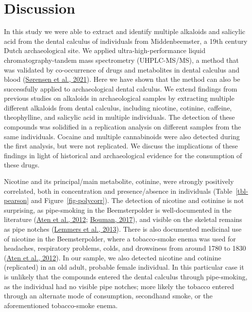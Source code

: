 \documentclass[
  letterpaper,
]{book}
\begin{document}
\hypertarget{discussion-2}{%
\section{Discussion}\label{discussion-2}}

In this study we were able to extract and identify multiple alkaloids
and salicylic acid from the dental calculus of individuals from
Middenbeemster, a 19th century Dutch archaeological site. We applied
ultra-high-performance liquid chromatography-tandem mass spectrometry
(UHPLC-MS/MS), a method that was validated by co-occurrence of drugs and
metabolites in dental calculus and blood
(\protect\hyperlink{ref-sorensenDrugsCalculus2021}{Sørensen et al.,
2021}). Here we have shown that the method can also be successfully
applied to archaeological dental calculus. We extend findings from
previous studies on alkaloids in archaeological samples by extracting
multiple different alkaloids from dental calculus, including nicotine,
cotinine, caffeine, theophylline, and salicylic acid in multiple
individuals. The detection of these compounds was solidified in a
replication analysis on different samples from the same individuals.
Cocaine and multiple cannabinoids were also detected during the first
analysis, but were not replicated. We discuss the implications of these
findings in light of historical and archaeological evidence for the
consumption of these drugs.

Nicotine and its principal/main metabolite, cotinine, were strongly
positively correlated, both in concentration and presence/absence in
individuals (Table~\ref{tbl-pearson} and Figure~\ref{fig-polycorr}). The
detection of nicotine and cotinine is not surprising, as pipe-smoking in
the Beemsterpolder is well-documented in the literature
(\protect\hyperlink{ref-aten400Jaar2012}{Aten et al., 2012};
\protect\hyperlink{ref-boumanBegravenis2017}{Bouman, 2017}), and visible
on the skeletal remains as pipe notches
(\protect\hyperlink{ref-lemmersMiddenbeemster2013}{Lemmers et al.,
2013}). There is also documented medicinal use of nicotine in the
Beemsterpolder, where a tobacco-smoke enema was used for headaches,
respiratory problems, colds, and drowsiness from around 1780 to 1830
(\protect\hyperlink{ref-aten400Jaar2012}{Aten et al., 2012}). In our
sample, we also detected nicotine and cotinine (replicated) in an old
adult, probable female individual. In this particular case it is
unlikely that the compounds entered the dental calculus through
pipe-smoking, as the individual had no visible pipe notches; more likely
the tobacco entered through an alternate mode of consumption, secondhand
smoke, or the aforementioned tobacco-smoke enema.
\end{document}
